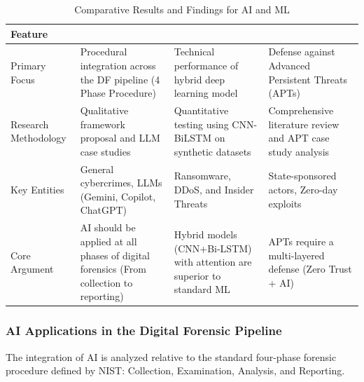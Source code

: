 \documentclass[12pt,a4paper]{article}
\begin{document}
\begin{table}[H]
\caption{Comparative Results and Findings for AI and ML}
\label{tab:inclusion-exclusion}

\fontsize{10pt}{12pt}\selectfont
\begin{tabularx}{\textwidth}{|p{3cm}|X|X|X|}\hline
\centering\textbf {Feature} &
\centering\textbf{\cite{sanna2025improving}} &
\centering\textbf{\cite{11385975}} & 
\centering\textbf{\cite{11166697}}
\tabularnewline
\hline

\centering Primary Focus &
\centering Procedural integration across the DF pipeline (4 Phase Procedure) &
\centering Technical performance of hybrid deep learning model & 
\centering Defense against Advanced Persistent Threats (APTs)
\tabularnewline
\hline

\centering Research Methodology &
\centering Qualitative framework proposal and LLM case studies &
\centering Quantitative testing using CNN-BiLSTM on synthetic datasets & 
\centering Comprehensive literature review and APT case study analysis
\tabularnewline
\hline

\centering Key Entities &
\centering General cybercrimes, LLMs (Gemini, Copilot, ChatGPT) &
\centering Ransomware, DDoS, and Insider Threats & 
\centering State-sponsored actors, Zero-day exploits
\tabularnewline
\hline

\centering Core Argument &
\centering AI should be applied at all phases of digital forensics (From collection to reporting) &
\centering Hybrid models (CNN+Bi-LSTM) with attention are superior to standard ML & 
\centering APTs require a multi-layered defense (Zero Trust + AI)
\tabularnewline
\hline

\end{tabularx}
\end{table}


\subsubsection{AI Applications in the Digital Forensic Pipeline}
The integration of AI is analyzed relative to the standard four-phase forensic procedure defined by NIST: Collection, Examination, Analysis, and Reporting.
\end{document}
